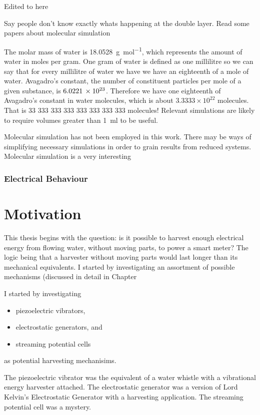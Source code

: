     {\color{blue} Edited to here

    Say people don't know exactly whats happening at the double layer.
    Read some papers about molecular simulation
    }

    The molar mass of water is \SI{18.0528}{\gram\per\mole}, which represents the amount of water in moles per gram.
    One gram of water is defined as one millilitre so we can say that for every millilitre of water we have we have an eighteenth of a mole of water.
    Avagadro's constant, the number of constituent particles per mole of a given substance, is $6.0221\thinspace \times 10^{23}$.
    Therefore we have one eighteenth of Avagadro's constant in water molecules, which is about $3.3333\times 10^{22}$ molecules.
    That is 33 333 333 333 333 333 333 333 molecules!
    Relevant simulations are likely to require volumes greater than \SI{1}{\milli\litre} to be useful.

    Molecular simulation has not been employed in this work.
    There may be ways of simplifying necessary simulations in order to grain results from reduced systems.
    Molecular simulation is a very interesting


  \subsubsection*{Electrical Behaviour}

\section{Motivation}
  This thesis begins with the question: is it possible to harvest enough electrical energy from flowing water, without moving parts, to power a smart meter?
  The logic being that a harvester without moving parts would last longer than its mechanical equivalents.
  I started by investigating an assortment of possible mechanisms (discussed in detail in Chapter

  I started by investigating
  \begin{itemize}
    \item piezoelectric vibrators,
    \item electrostatic generators, and
    \item streaming potential cells
  \end{itemize}
  as potential harvesting mechanisims.

  The piezoelectric vibrator was the equivalent of a water whistle with a vibrational energy harvester attached.
  The electrostatic generator was a version of Lord Kelvin's Electrostatic Generator with a harvesting application.
  The streaming potential cell was a mystery.

